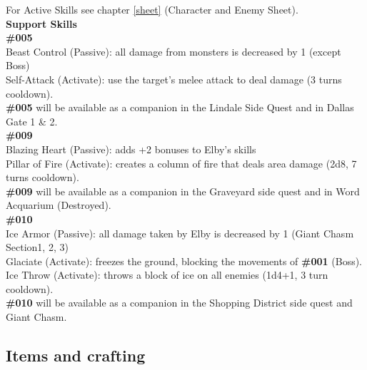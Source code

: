 For Active Skills see chapter \ref{sheet} (Character and Enemy Sheet).\\

\textbf{Support Skills}\\

\textbf{\#005}\\
Beast Control (Passive): all damage from monsters is decreased by 1 (except Boss)\\
Self-Attack (Activate): use the target's melee attack to deal damage (3 turns cooldown).\\
\textbf{\#005} will be available as a companion in the Lindale Side Quest and in Dallas Gate 1 \& 2.\\

\textbf{\#009}\\
Blazing Heart (Passive): adds +2 bonuses to Elby's skills\\
Pillar of Fire (Activate): creates a column of fire that deals area damage (2d8, 7 turns cooldown).\\
\textbf{\#009} will be available as a companion in the Graveyard side quest and in Word Acquarium (Destroyed).\\

\textbf{\#010}\\
Ice Armor (Passive): all damage taken by Elby is decreased by 1 (Giant Chasm Section1, 2, 3)\\
Glaciate (Activate): freezes the ground, blocking the movements of \textbf{\#001} (Boss).\\
Ice Throw (Activate): throws a block of ice on all enemies (1d4+1, 3 turn cooldown).\\
\textbf{\#010} will be available as a companion in the Shopping District side quest and Giant Chasm.

\newpage

\subsection{Items and crafting}

